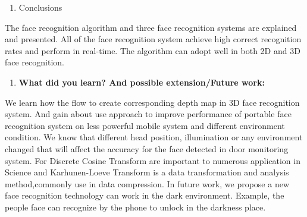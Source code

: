 \documentclass[a4paper,12pt]{article}
\begin{document}
\maketitle
\begin{enumerate}[{5.}]\bfseries
\item{\normalsize Conclusions}
\end{enumerate}
The face recognition algorithm and three face recognition systems are explained and presented. All of the face recognition system achieve high correct recognition rates and perform in real-time. The algorithm can adopt well in both 2D and 3D face recognition.\\


\maketitle
\begin{enumerate}[{6.}]\bfseries
\item{\normalsize \textbf{What did you learn? And possible extension/Future work:} }
\end{enumerate}
We learn how the flow to create corresponding depth map in 3D face recognition system. And gain about use approach to improve performance of portable face recognition system on less powerful mobile system and different environment condition. We know that different head position, illumination or any environment changed that will affect the accuracy for the face detected in door monitoring system. For Discrete Cosine Transform are important to numerous application in Science and Karhunen-Loeve Transform is a data transformation and analysis method,commonly use in data compression. In future work, we propose a new face recognition technology can work in the dark environment. Example, the people face can recognize by the phone to unlock in the darkness place.\\

{}
\end{document}
